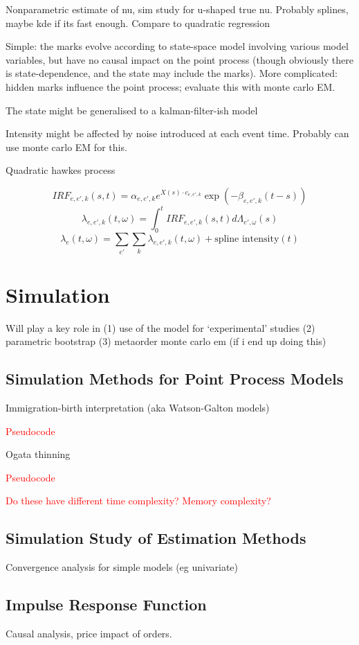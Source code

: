 \documentclass[honours,12pt]{unswthesis}
\numberwithin{equation}{section}
\begin{document}
Nonparametric estimate of nu, sim study for u-shaped true nu. Probably splines, maybe kde if its fast enough. Compare to quadratic regression

Simple: the marks evolve according to state-space model involving various model variables, but have no causal impact on the point process (though obviously there is state-dependence, and the state may include the marks). More complicated: hidden marks influence the point process; evaluate this with monte carlo EM.

The state might be generalised to a kalman-filter-ish model \cite{SmithBrown}

Intensity might be affected by noise introduced at each event time. Probably can use monte carlo EM for this.

Quadratic hawkes process

$$IRF_{e,e',k}(s,t) = \alpha_{e,e',k} e^{X(s)\cdot c_{e,e',k}}\exp\left(-\beta_{e,e',k}(t-s)\right)$$
$$\lambda_{e,e',k}(t,\omega) = \int_0^t IRF_{e,e',k}(s,t) d\Lambda_{e',\omega}(s)$$
$$\lambda_e(t,\omega) = \sum_{e'} \sum_k \lambda_{e,e',k}(t,\omega) + \text{spline intensity}(t)$$

\chapter{Simulation}
Will play a key role in (1) use of the model for `experimental' studies (2) parametric bootstrap (3) metaorder monte carlo em (if i end up doing this)

\section{Simulation Methods for Point Process Models}
Immigration-birth interpretation \cite{MorariuPatrichiPakkanen}
(aka Watson-Galton models)

\textcolor{red}{Pseudocode}

Ogata thinning 

\textcolor{red}{Pseudocode}

\textcolor{red}{Do these have different time complexity? Memory complexity?}

\section{Simulation Study of Estimation Methods}
Convergence analysis for simple models (eg univariate)

\section{Impulse Response Function}
Causal analysis, price impact of orders.
\end{document}
